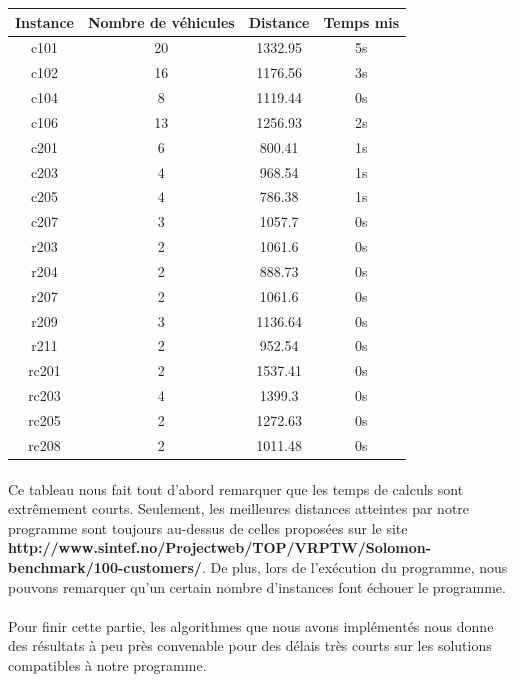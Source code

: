\documentclass[12pt]{article}
\begin{document}
\begin{tabular}{ |*{4}{c|} }
\hline
   Instance & Nombre de véhicules & Distance & Temps mis \\
 \hline
   c101 & 20 & 1332.95 & 5s \\
 \hline
   c102 & 16 & 1176.56 & 3s \\
 \hline
   c104 & 8 & 1119.44 & 0s \\
 \hline
   c106 & 13 & 1256.93 & 2s \\
 \hline
   c201 & 6 & 800.41 & 1s \\
 \hline
   c203 & 4 & 968.54 & 1s \\
 \hline
   c205 & 4 & 786.38 & 1s \\
 \hline
   c207 & 3 & 1057.7 & 0s \\
 \hline
   r203 & 2 & 1061.6 & 0s \\
 \hline
   r204 & 2 & 888.73 & 0s \\
 \hline
   r207 & 2 & 1061.6 & 0s \\
 \hline
   r209 & 3 & 1136.64 & 0s \\
 \hline
   r211 & 2 & 952.54 & 0s \\
 \hline
   rc201 & 2 & 1537.41 & 0s \\
 \hline
   rc203 & 4 & 1399.3 & 0s \\
 \hline
   rc205 & 2 & 1272.63 & 0s \\
 \hline
   rc208 & 2 & 1011.48 & 0s \\
 \hline
 \end{tabular}

\paragraph{}
Ce tableau nous fait tout d'abord remarquer que les temps de calculs sont extrêmement courts. Seulement, les meilleures distances atteintes par notre 
programme sont toujours au-dessus de celles proposées sur le site \textbf{http://www.sintef.no/Projectweb/TOP/VRPTW/Solomon-benchmark/100-customers/}.
De plus, lors de l'exécution du programme, nous pouvons remarquer qu'un certain nombre d'instances font échouer le programme. 

\paragraph{}
Pour finir cette partie, les algorithmes que nous avons implémentés nous donne des résultats à peu près convenable pour des délais très courts sur 
les solutions compatibles à notre programme.
\end{document}
